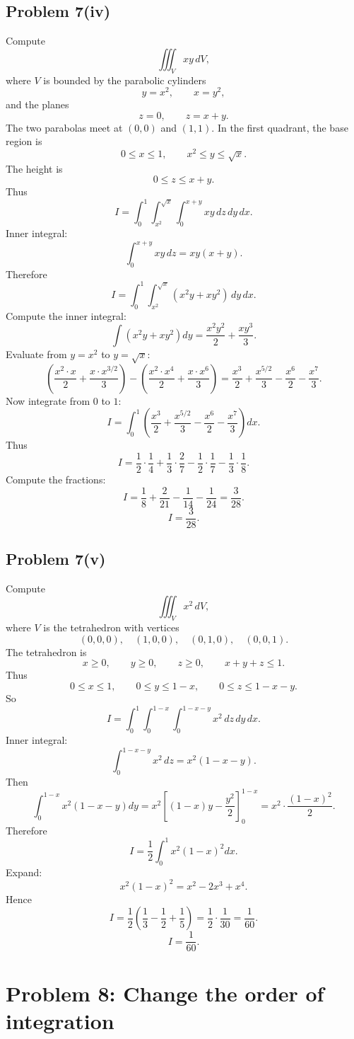 \documentclass[11pt,a4paper]{article}
\begin{document}
\subsection{Problem 7(iv)}
Compute
\[
 \iiint_Vxy\,dV,
\]
where \(V\) is bounded by the parabolic cylinders
\[
 y=x^2,
\qquad x=y^2,
\]
and the planes
\[
 z=0,
\qquad z=x+y.
\]
The two parabolas meet at \((0,0)\) and \((1,1)\).  In the first quadrant, the base region is
\[
 0\le x\le1,
\qquad x^2\le y\le\sqrt{x}.
\]
The height is
\[
 0\le z\le x+y.
\]
Thus
\[
 I=\int_0^1\int_{x^2}^{\sqrt{x}}\int_0^{x+y}xy\,dz\,dy\,dx.
\]
Inner integral:
\[
 \int_0^{x+y}xy\,dz=xy(x+y).
\]
Therefore
\[
 I=\int_0^1\int_{x^2}^{\sqrt{x}}(x^2y+xy^2)\,dy\,dx.
\]
Compute the inner integral:
\[
 \int(x^2y+xy^2)dy=\frac{x^2y^2}{2}+\frac{xy^3}{3}.
\]
Evaluate from \(y=x^2\) to \(y=\sqrt{x}\):
\[
 \left(\frac{x^2\cdot x}{2}+\frac{x\cdot x^{3/2}}{3}\right)
 -\left(\frac{x^2\cdot x^4}{2}+\frac{x\cdot x^6}{3}\right)
 =\frac{x^3}{2}+\frac{x^{5/2}}{3}-\frac{x^6}{2}-\frac{x^7}{3}.
\]
Now integrate from \(0\) to \(1\):
\[
 I=\int_0^1\left(\frac{x^3}{2}+\frac{x^{5/2}}{3}-\frac{x^6}{2}-\frac{x^7}{3}\right)dx.
\]
Thus
\[
 I=\frac12\cdot\frac14+\frac13\cdot\frac{2}{7}-\frac12\cdot\frac17-\frac13\cdot\frac18.
\]
Compute the fractions:
\[
 I=\frac18+\frac{2}{21}-\frac1{14}-\frac1{24}=\frac{3}{28}.
\]
\[
\boxed{I=\frac{3}{28}.}
\]

\subsection{Problem 7(v)}
Compute
\[
 \iiint_Vx^2\,dV,
\]
where \(V\) is the tetrahedron with vertices
\[
 (0,0,0),\quad(1,0,0),\quad(0,1,0),\quad(0,0,1).
\]
The tetrahedron is
\[
 x\ge0,
\qquad y\ge0,
\qquad z\ge0,
\qquad x+y+z\le1.
\]
Thus
\[
 0\le x\le1,
\qquad 0\le y\le1-x,
\qquad 0\le z\le1-x-y.
\]
So
\[
 I=\int_0^1\int_0^{1-x}\int_0^{1-x-y}x^2\,dz\,dy\,dx.
\]
Inner integral:
\[
 \int_0^{1-x-y}x^2\,dz=x^2(1-x-y).
\]
Then
\[
 \int_0^{1-x}x^2(1-x-y)dy
 =x^2\left[(1-x)y-\frac{y^2}{2}\right]_0^{1-x}
 =x^2\cdot\frac{(1-x)^2}{2}.
\]
Therefore
\[
 I=\frac12\int_0^1x^2(1-x)^2dx.
\]
Expand:
\[
 x^2(1-x)^2=x^2-2x^3+x^4.
\]
Hence
\[
 I=\frac12\left(\frac13-\frac12+\frac15\right)
 =\frac12\cdot\frac1{30}
 =\frac1{60}.
\]
\[
\boxed{I=\frac1{60}.}
\]

\section{Problem 8: Change the order of integration}
\end{document}
